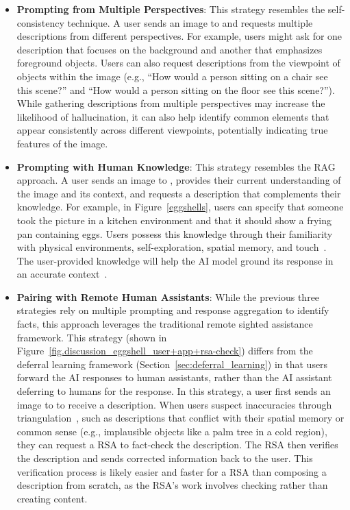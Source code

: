 {\begin{itemize}
    \item \textbf{Prompting from Multiple Perspectives}: This strategy resembles the self-consistency technique. A user sends an image to \bma{} and requests multiple descriptions from different perspectives. For example, users might ask for one description that focuses on the background and another that emphasizes foreground objects. Users can also request descriptions from the viewpoint of objects within the image (e.g., ``How would a person sitting on a chair see this scene?'' and ``How would a person sitting on the floor see this scene?''). While gathering descriptions from multiple perspectives may increase the likelihood of hallucination, it can also help identify common elements that appear consistently across different viewpoints, potentially indicating true features of the image.    
    \item \textbf{Prompting with Human Knowledge}: This strategy resembles the RAG approach. A user sends an image to \bma{}, provides their current understanding of the image and its context, and requests a description that complements their knowledge. For example, in Figure~\ref{eggshells}, users can specify that someone took the picture in a kitchen environment and that it should show a frying pan containing eggs. Users possess this knowledge through their familiarity with physical environments, self-exploration, spatial memory, and touch~\cite{gonzalez2024investigating}. The user-provided knowledge will help the AI model ground its response in an accurate context~\cite{liu2024coquest}.     
    \item \textbf{Pairing with Remote Human Assistants}: While the previous three strategies rely on multiple prompting and response aggregation to identify facts, this approach leverages the traditional remote sighted assistance framework.
    This strategy (shown in Figure~\ref{fig.discussion_eggshell_user+app+rsa-check}) differs from the deferral learning framework (Section~\ref{sec:deferral_learning}) in that users forward the AI responses to human assistants, rather than the AI assistant deferring to humans for the response.
    In this strategy, a user first sends an image to \bma{} to receive a description. When users suspect inaccuracies through triangulation~\cite{gonzalez2024investigating}, such as descriptions that conflict with their spatial memory or common sense (e.g., implausible objects like a palm tree in a cold region), they can request a RSA to fact-check the description. The RSA then verifies the description and sends corrected information back to the user. This verification process is likely easier and faster for a RSA than composing a description from scratch, as the RSA's work involves checking rather than creating content.
\end{itemize}
}

